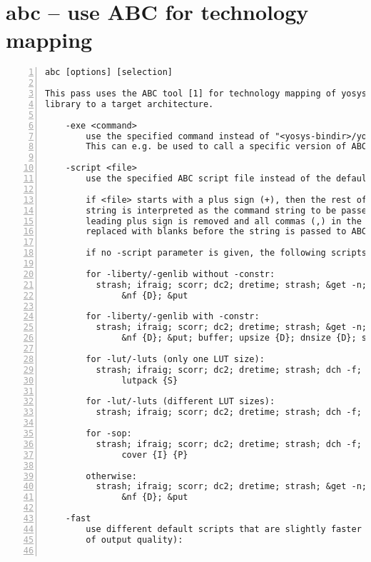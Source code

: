 
\section{abc -- use ABC for technology mapping}
\label{cmd:abc}
\begin{lstlisting}[numbers=left,frame=single]
    abc [options] [selection]

This pass uses the ABC tool [1] for technology mapping of yosys's internal gate
library to a target architecture.

    -exe <command>
        use the specified command instead of "<yosys-bindir>/yosys-abc" to execute ABC.
        This can e.g. be used to call a specific version of ABC or a wrapper.

    -script <file>
        use the specified ABC script file instead of the default script.

        if <file> starts with a plus sign (+), then the rest of the filename
        string is interpreted as the command string to be passed to ABC. The
        leading plus sign is removed and all commas (,) in the string are
        replaced with blanks before the string is passed to ABC.

        if no -script parameter is given, the following scripts are used:

        for -liberty/-genlib without -constr:
          strash; ifraig; scorr; dc2; dretime; strash; &get -n; &dch -f;
               &nf {D}; &put

        for -liberty/-genlib with -constr:
          strash; ifraig; scorr; dc2; dretime; strash; &get -n; &dch -f;
               &nf {D}; &put; buffer; upsize {D}; dnsize {D}; stime -p

        for -lut/-luts (only one LUT size):
          strash; ifraig; scorr; dc2; dretime; strash; dch -f; if; mfs2;
               lutpack {S}

        for -lut/-luts (different LUT sizes):
          strash; ifraig; scorr; dc2; dretime; strash; dch -f; if; mfs2

        for -sop:
          strash; ifraig; scorr; dc2; dretime; strash; dch -f;
               cover {I} {P}

        otherwise:
          strash; ifraig; scorr; dc2; dretime; strash; &get -n; &dch -f;
               &nf {D}; &put

    -fast
        use different default scripts that are slightly faster (at the cost
        of output quality):


\end{lstlisting}

